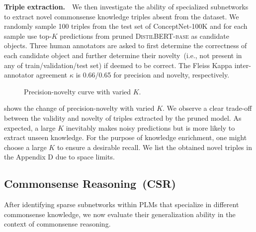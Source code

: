 \textbf{Triple extraction.}~~We then investigate the ability of specialized 
subnetworks to extract novel commonsense knowledge triples absent 
from the dataset. We randomly sample 100 triples from the test set of 
ConceptNet-100K and for each sample use top-$K$ predictions from 
pruned \textsc{DistilBERT-base} as candidate objects. 
Three human annotators are asked to first determine the correctness of 
each candidate object and further determine their novelty~(i.e., not present 
in any of train/validation/test set) if deemed to be correct. 
The Fleiss Kappa inter-annotator agreement $\kappa$ is 0.66/0.65 
for precision and novelty, respectively.
\begin{figure}[th]
	\centering
	\caption{Precision-novelty curve with varied $K$.} \label{fig:extraction}
\end{figure}
 shows the change of precision-novelty with varied $K$. We observe a clear trade-off between the validity and novelty of triples extracted by the pruned model. As expected, a large $K$ inevitably makes noisy predictions but is more likely to extract unseen knowledge. For the purpose of knowledge enrichment, one might choose a large $K$ to ensure a desirable recall. We list the obtained novel triples in the Appendix D due to space limits.






\subsection{Commonsense Reasoning~(CSR)}
\label{sec:csr}
After identifying sparse subnetworks within PLMs that specialize in different commonsense knowledge, we now evaluate their generalization ability in the context of commonsense reasoning.

